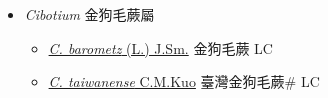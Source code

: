 
  \begin{itemize}
 \item[] \textit{Cibotium} 金狗毛蕨屬
                    
  \begin{itemize}
        \item[] \href{http://www.theplantlist.org/tpl1.1/search?q=Cibotium+barometz}{\textit{C. barometz} (L.) J.Sm.}   金狗毛蕨 LC
        \item[] \href{http://www.theplantlist.org/tpl1.1/search?q=Cibotium+taiwanense}{\textit{C. taiwanense} C.M.Kuo}   臺灣金狗毛蕨\# LC
  \end{itemize}
  \end{itemize}
